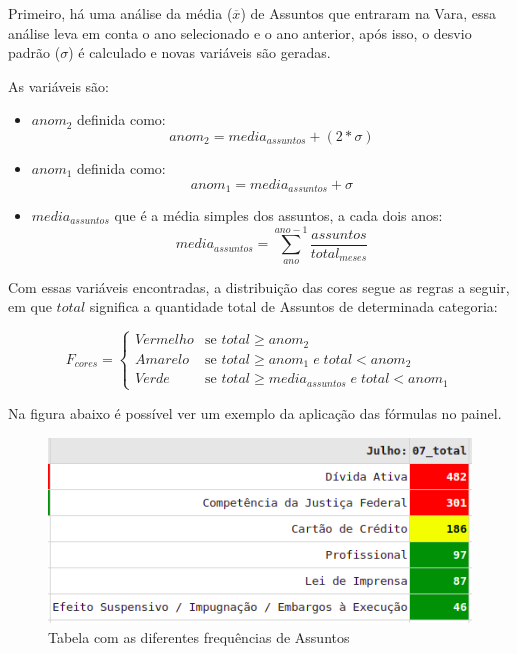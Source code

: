 Primeiro, há uma análise da média ($\overline{x}$) de Assuntos que entraram na Vara, essa análise leva em conta o ano selecionado e o ano anterior, após isso, o desvio padrão ($\sigma$) é calculado e novas variáveis são geradas.

As variáveis são:
\begin{itemize}
	\item $anom_2$ definida como: $$anom_2 = media_{assuntos} + (2*\sigma)$$
	
	\item $anom_1$ definida como: $$anom_1 = media_{assuntos} + \sigma$$
	
	\item $media_{assuntos}$ que é a média simples dos assuntos, a cada dois anos:
	$$media_{assuntos} = \sum\limits_{ano}^{ano-1}\frac{assuntos}{total_{meses}}$$
\end{itemize}

Com essas variáveis encontradas, a distribuição das cores segue as regras a seguir, em que $total$ significa a quantidade total de Assuntos de determinada categoria:

\begin{equation}
	F_{cores} =
	\begin{cases}
		Vermelho & \text{se $total \geq anom_2$}\\
		Amarelo & \text{se $total \geq anom_1 \;e\; total < anom_2$}\\
		Verde & \text{se $total \geq media_{assuntos} \;e\; total < anom_1$}
	\end{cases}       
\end{equation}

Na figura abaixo é possível ver um exemplo da aplicação das fórmulas no painel.

\begin{figure}[h]
	\centering
	\includegraphics[scale=0.65]{./figures/cap2/exemplo_painel.png}
	\caption{Tabela com as diferentes frequências de Assuntos}
\end{figure}

